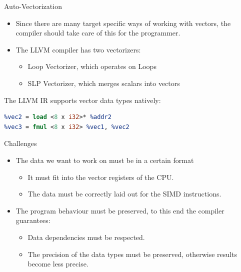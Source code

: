 \documentclass[]{beamer}
\begin{document}
\begin{frame}[fragile]{Auto-Vectorization}
\begin{itemize}
  \item Since there are many target specific ways of working with vectors, the compiler should take care of this
        for the programmer.
  \item The LLVM compiler has two vectorizers:
  \begin{itemize}
    \item Loop Vectorizer, which operates on Loops
    \item SLP Vectorizer, which merges scalars into vectors
  \end{itemize}
\end{itemize}
The LLVM IR supports vector data types natively:
\begin{lstlisting}[language=LLVM]
%vec1 = load <8 x i32>* %addr1
%vec2 = load <8 x i32>* %addr2
%vec3 = fmul <8 x i32> %vec1, %vec2
\end{lstlisting}
\end{frame}

\begin{frame}{Challenges}
\begin{itemize}
  \item The data we want to work on must be in a certain format
  \begin{itemize}
    \item It must fit into the vector registers of the CPU.
    \item The data must be correctly laid out for the SIMD instructions.
  \end{itemize}
  \item The program behaviour must be preserved, to this end the compiler guarantees:
  \begin{itemize}
    \item Data dependencies must be respected.
    \item The precision of the data types must be preserved, otherwise results become less precise.
  \end{itemize}
\end{itemize}
\end{frame}

\end{document}
